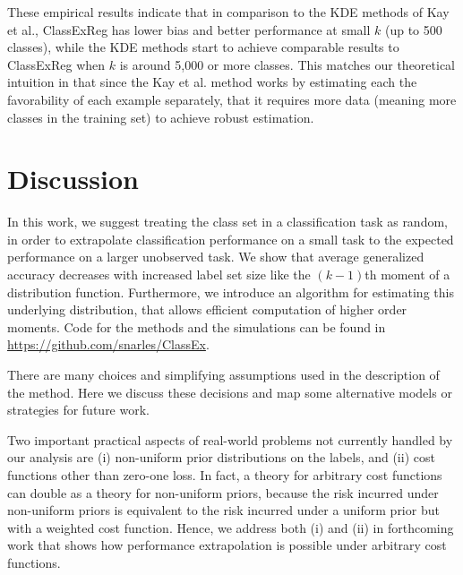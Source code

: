 \documentclass[twoside,11pt]{article}
\begin{document}
These empirical results indicate that in comparison to the KDE methods of Kay et al., ClassExReg has lower bias and better performance at small $k$ (up to 500 classes), while the KDE methods start to achieve comparable results to ClassExReg when $k$ is around 5,000 or more classes.  This matches our theoretical intuition in that since the Kay et al. method works by estimating each the favorability of each example separately, that it requires more data (meaning more classes in the training set) to achieve robust estimation.  %

\section{Discussion}
\label{sec:discussion}
In this work, we suggest treating the class set in a classification
task as random, in order to extrapolate classification performance on
a small task to the expected performance on a larger unobserved task.
We show that average generalized accuracy decreases with increased
label set size like the $(k-1)$th moment of a distribution function.
Furthermore, we introduce an algorithm for estimating this underlying
distribution, that allows efficient computation of higher order
moments. Code for the methods and the simulations can be found in \url{https://github.com/snarles/ClassEx}.

There are many choices and simplifying assumptions used in
the description of the method.  Here we discuss these
decisions and map some alternative models or strategies for future
work.




Two important practical aspects of real-world problems not currently handled by our analysis are (i) non-uniform prior distributions on the labels,
and (ii) cost functions other than zero-one loss.  In fact, a theory for arbitrary cost functions can double as a theory for non-uniform priors, because the risk incurred under
non-uniform priors is equivalent to the risk incurred under a uniform prior but with a weighted cost function.
Hence, we address both (i) and (ii) in forthcoming work that shows how performance extrapolation is possible under arbitrary cost functions. %
\end{document}
